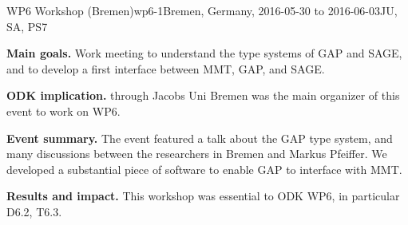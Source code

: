 \begin{event}{WP6 Workshop (Bremen)}{wp6-1}{Bremen, Germany, 2016-05-30 to 2016-06-03}{JU, SA, PS}{7}{}

\textbf{Main goals.} Work meeting to understand the type systems of GAP and
SAGE, and to develop a first interface between MMT, GAP, and SAGE.

\textbf{ODK implication.} \ODK through Jacobs Uni Bremen was the main organizer of this
event to work on WP6.

\textbf{Event summary.} The event featured a talk about the GAP type system, and
many discussions between the researchers in Bremen and Markus Pfeiffer. We
developed a substantial piece of software to enable GAP to interface with MMT.

\textbf{Results and impact.} 
This workshop was essential to ODK WP6, in particular D6.2, T6.3.

\end{event}
